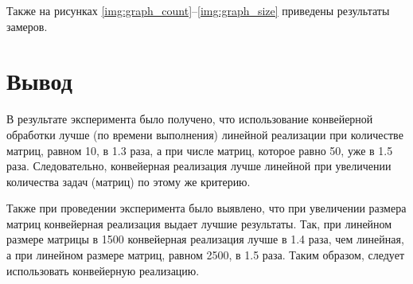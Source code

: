 \clearpage

Также на рисунках \ref{img:graph_count}--\ref{img:graph_size} приведены результаты замеров.


\clearpage


\section*{Вывод}

В результате эксперимента было получено, что использование конвейерной обработки лучше (по времени выполнения) линейной реализации при количестве матриц, равном 10, в 1.3 раза, а при числе матриц, которое равно 50, уже в 1.5 раза. Следовательно, конвейерная реализация лучше линейной при увеличении количества задач (матриц) по этому же критерию.

Также при проведении эксперимента было выявлено, что при увеличении размера матриц конвейерная реализация выдает лучшие результаты. Так, при линейном размере матрицы в 1500 конвейерная реализация лучше в 1.4 раза, чем линейная, а при линейном размере матриц, равном 2500, в 1.5 раза. Таким образом, следует использовать конвейерную реализацию.